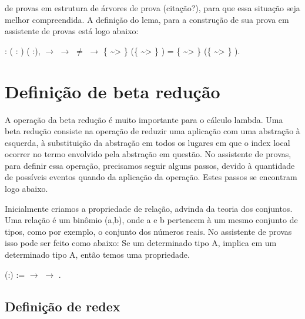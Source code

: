 de provas em estrutura de árvores de prova (citação?), para que essa situação seja melhor compreendida. A definição do lema, para a construção de 
sua prova em assistente de provas está logo abaixo: \begin{coqdoccode}
\coqdocemptyline
\coqdocnoindent
{} : \coqdockw{\ensuremath{\forall}} (  : ) ( :),   \ensuremath{\rightarrow}   \ensuremath{\rightarrow}  \ensuremath{\not=}  \ensuremath{\rightarrow} \{ \~{}> \} (\{ \~{}> \} ) = \{ \~{}> \} (\{ \~{}> \} ).\coqdoceol
\coqdocemptyline
\coqdocemptyline
\coqdocemptyline
\coqdocemptyline
\end{coqdoccode}
\section{Definição de beta redução}



 A operação da beta redução é muito importante para o cálculo lambda. Uma beta redução consiste na operação de reduzir uma aplicação
com uma abstração à esquerda, à substituição da abstração em todos os lugares em que o index local ocorrer no termo envolvido pela abstração
em questão. No assistente de provas, para definir essa operação, precisamos seguir alguns passos, devido à quantidade de possíveis eventos quando
da aplicação da operação. Estes passos se encontram logo abaixo.

 Inicialmente criamos a propriedade de relação, advinda da teoria dos conjuntos. Uma relação é um binômio (a,b), onde a e b pertencem 
à um mesmo conjunto de tipos, como por exemplo, o conjunto dos números reais. No assistente de provas isso pode ser feito como abaixo: Se
um determinado tipo A, implica em um determinado tipo A, então temos uma propriedade.\begin{coqdoccode}
\coqdocemptyline
\coqdocnoindent
{}  (:) :=  \ensuremath{\rightarrow}  \ensuremath{\rightarrow} .\coqdoceol
\coqdocemptyline
\end{coqdoccode}
\subsection{Definição de redex}




